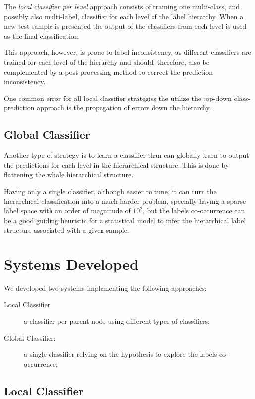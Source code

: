 \documentclass[11pt,a4paper]{article}
\begin{document}
The \textit{local classifier per level} approach consists of training one
multi-class, and possibly also multi-label, classifier for each level of the label
hierarchy. When a new test sample is presented the output of the classifiers
from each level is used as the final classification.

This approach, however, is prone to label inconsistency, as different classifiers
are trained for each level of the hierarchy and should, therefore, also be
complemented by a post-processing method to correct the prediction inconsistency.

One common error for all local classifier strategies the utilize the top-down
class-prediction approach is the propagation of errors down the hierarchy.



\subsection{Global Classifier}

Another type of strategy is to learn a classifier than can globally learn to
output the predictions for each level in the hierarchical structure. This is
done by flattening the whole hierarchical structure.

Having only a single classifier, although easier to tune, it can turn the
hierarchical classification into a much harder problem, specially having a
sparse label space with an order of magnitude of $10^2$, but the labels
co-occurrence can be a good guiding heuristic for a statistical model to infer
the hierarchical label structure associated with a given sample.

\section{Systems Developed}\label{system}

We developed two systems implementing the following approaches:

\begin{description}
  \item[Local Classifier:] a classifier per parent node using
  different types of classifiers;
  \item[Global Classifier:] a single classifier relying on the hypothesis
  to explore the labels co-occurrence;
\end{description}

\subsection{Local Classifier}
\end{document}
